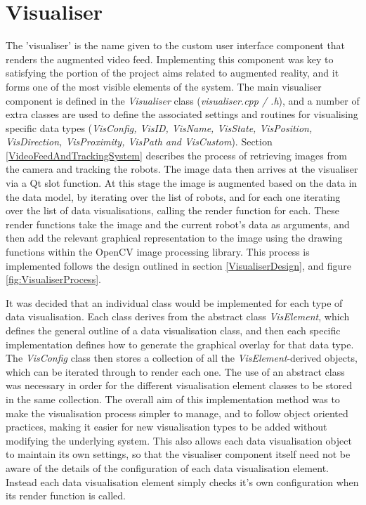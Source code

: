 
\section{Visualiser} \label{VisualiserImplementation}
The 'visualiser' is the name given to the custom user interface component that renders the augmented video feed. Implementing this component was key to satisfying the portion of the project aims related to augmented reality, and it forms one of the most visible elements of the system. The main visualiser component is defined in the \textit{Visualiser} class (\textit{visualiser.cpp / .h}), and a number of extra classes are used to define the associated settings and routines for visualising specific data types (\textit{VisConfig, VisID, VisName, VisState, VisPosition, VisDirection, VisProximity, VisPath and VisCustom}). Section \ref{VideoFeedAndTrackingSystem} describes the process of retrieving images from the camera and tracking the robots. The image data then arrives at the visualiser via a Qt slot function. At this stage the image is augmented based on the data in the data model, by iterating over the list of robots, and for each one iterating over the list of data visualisations, calling the render function for each. These render functions take the image and the current robot's data as arguments, and then add the relevant graphical representation to the image using the drawing functions within the OpenCV image processing library. This process is implemented follows the design outlined in section \ref{VisualiserDesign}, and figure \ref{fig:VisualiserProcess}.

It was decided that an individual class would be implemented for each type of data visualisation. Each class derives from the abstract class \textit{VisElement}, which defines the general outline of a data visualisation class, and then each specific implementation defines how to generate the graphical overlay for that data type. The \textit{VisConfig} class then stores a collection of all the \textit{VisElement}-derived objects, which can be iterated through to render each one. The use of an abstract class was necessary in order for the different visualisation element classes to be stored in the same collection. The overall aim of this implementation method was to make the visualisation process simpler to manage, and to follow object oriented practices, making it easier for new visualisation types to be added without modifying the underlying system. This also allows each data visualisation object to maintain its own settings, so that the visualiser component itself need not be aware of the details of the configuration of each data visualisation element. Instead each data visualisation element simply checks it's own configuration when its render function is called.

